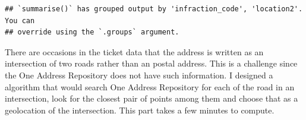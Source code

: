 \documentclass[
]{article}
\newenvironment{Shaded}{\begin{snugshade}}{\end{snugshade}}
\newcommand{\AttributeTok}[1]{\textcolor[rgb]{0.77,0.63,0.00}{#1}}
\newcommand{\FunctionTok}[1]{\textcolor[rgb]{0.00,0.00,0.00}{#1}}
\newcommand{\NormalTok}[1]{#1}
\newcommand{\OtherTok}[1]{\textcolor[rgb]{0.56,0.35,0.01}{#1}}
\newcommand{\SpecialCharTok}[1]{\textcolor[rgb]{0.00,0.00,0.00}{#1}}
\newcommand{\StringTok}[1]{\textcolor[rgb]{0.31,0.60,0.02}{#1}}
\begin{document}
\begin{Shaded}
\end{Shaded}

\begin{verbatim}
## `summarise()` has grouped output by 'infraction_code', 'location2'. You can
## override using the `.groups` argument.
\end{verbatim}

There are occasions in the ticket data that the address is written as an
intersection of two roads rather than an postal address. This is a
challenge since the One Address Repository does not have such
information. I designed a algorithm that would search One Address
Repository for each of the road in an intersection, look for the closest
pair of points among them and choose that as a geolocation of the
intersection. This part takes a few minutes to compute.
\end{document}
